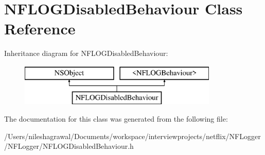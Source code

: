 \hypertarget{interface_n_f_l_o_g_disabled_behaviour}{}\section{N\+F\+L\+O\+G\+Disabled\+Behaviour Class Reference}
\label{interface_n_f_l_o_g_disabled_behaviour}
Inheritance diagram for N\+F\+L\+O\+G\+Disabled\+Behaviour\+:\begin{figure}[H]
\begin{center}
\leavevmode
\includegraphics[height=2.000000cm]{interface_n_f_l_o_g_disabled_behaviour}
\end{center}
\end{figure}


The documentation for this class was generated from the following file\+:\begin{DoxyCompactItemize}
\item 
/\+Users/nileshagrawal/\+Documents/workspace/interviewprojects/netflix/\+N\+F\+Logger/\+N\+F\+Logger/N\+F\+L\+O\+G\+Disabled\+Behaviour.\+h\end{DoxyCompactItemize}
